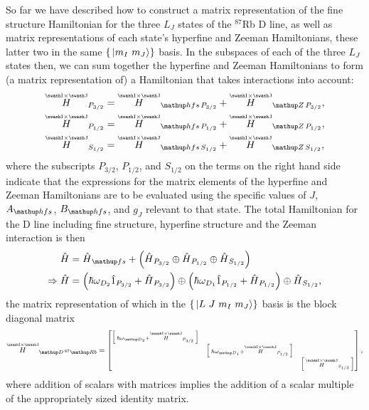 So far we have described how to construct a matrix representation of the fine structure Hamiltonian for the three $L_J$ states of the $^{87}$Rb D line, as well as matrix representations of each state's hyperfine and Zeeman Hamiltonians, these latter two in the same $\{\ket{m_I\ m_J}\}$ basis. In the subspaces of each of the three $L_J$ states then, we can sum together the hyperfine and Zeeman Hamiltonians to form (a matrix representation of) a Hamiltonian that takes interactions into account:
\begin{align}
\oversetIJ H_{P_{3/2}} &=
  \oversetIJ H_{\up{hfs}\,P_{3/2}} + \oversetIJ H_{\up{Z}\,P_{3/2}},\\
\oversetIJ H_{P_{1/2}} &=
  \oversetIJ H_{\up{hfs}\,P_{1/2}} + \oversetIJ H_{\up{Z}\,P_{1/2}},\\
\oversetIJ H_{S_{1/2}} &=
  \oversetIJ H_{\up{hfs}\,S_{1/2}} + \oversetIJ H_{\up{Z}\,S_{1/2}},
\end{align}
where the subscripts $P_{3/2}$, $P_{1/2}$, and $S_{1/2}$ on the terms on the right hand side indicate that the expressions for the matrix elements of the hyperfine and Zeeman Hamiltonians are to be evaluated using the specific values of $J$, $A_\up{hfs}$, $B_\up{hfs}$, and $g_J$ relevant to that state. The total Hamiltonian for the D line including fine structure, hyperfine structure and the Zeeman interaction is then
\begin{align}
\hat H &= \hat H_\up{fs} +
    \left(\hat H_{P_{3/2}} \oplus \hat H_{P_{1/2}} \oplus \hat H_{S_{1/2}} \right)\\
\Rightarrow \hat H &= 
\left(\hbar\omega_{D_2}\hat 1_{P_{3/2}} + \hat H_{P_{3/2}}\right) \oplus
\left(\hbar\omega_{D_1}\hat 1_{P_{1/2}} + \hat H_{P_{1/2}}\right) \oplus \hat H_{S_{1/2}},
\end{align}
the matrix representation of which in the $\{\ket{L\ J\ m_I\ m_J}\}$ basis is the block diagonal matrix
\begin{align}
\oversetIJ H_{\up{D}\,^{87}\up{Rb}}  = 
\left[\begin{matrix}
    \left[\begin{smallmatrix}
        \hbar\omega_{\up{D}_2} + \oversetIJ  H_{P_{3/2}}\\
    \end{smallmatrix} \right]\\
    & \left[\begin{smallmatrix}
        \hbar\omega_{\up{D}_1} + \oversetIJ  H_{P_{1/2}}\\
      \end{smallmatrix} \right]\\
    & &\left[\begin{smallmatrix}
        \oversetIJ  H_{S_{1/2}}\\
        \end{smallmatrix} \right]\\
\end{matrix} \right],
\end{align}
where addition of scalars with matrices implies the addition of a scalar multiple of the appropriately sized identity matrix.

